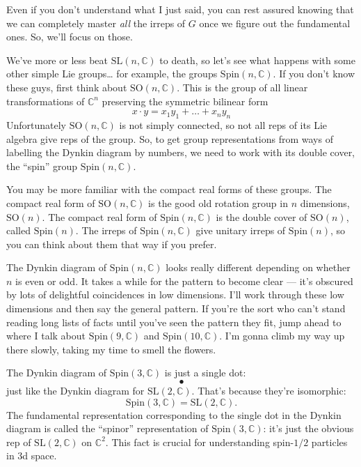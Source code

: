 \documentclass{article}
\begin{document}
Even if you don't understand what I just said, you can rest assured
knowing that we can completely master \emph{all} the irreps of \(G\)
once we figure out the fundamental ones. So, we'll focus on those.

We've more or less beat \(\mathrm{SL}(n,\mathbb{C})\) to death, so let's
see what happens with some other simple Lie groups\ldots{} for example,
the groups \(\mathrm{Spin}(n,\mathbb{C})\). If you don't know these
guys, first think about \(\mathrm{SO}(n,\mathbb{C})\). This is the group
of all linear transformations of \(\mathbb{C}^n\) preserving the
symmetric bilinear form \[x\cdot y = x_1 y_1 + \ldots + x_n y_n\]
Unfortunately \(\mathrm{SO}(n,\mathbb{C})\) is not simply connected, so
not all reps of its Lie algebra give reps of the group. So, to get group
representations from ways of labelling the Dynkin diagram by numbers, we
need to work with its double cover, the ``spin'' group
\(\mathrm{Spin}(n,\mathbb{C})\).

You may be more familiar with the compact real forms of these groups.
The compact real form of \(\mathrm{SO}(n,\mathbb{C})\) is the good old
rotation group in \(n\) dimensions, \(\mathrm{SO}(n)\). The compact real
form of \(\mathrm{Spin}(n,\mathbb{C})\) is the double cover of
\(\mathrm{SO}(n)\), called \(\mathrm{Spin}(n)\). The irreps of
\(\mathrm{Spin}(n,\mathbb{C})\) give unitary irreps of
\(\mathrm{Spin}(n)\), so you can think about them that way if you
prefer.

The Dynkin diagram of \(\mathrm{Spin}(n,\mathbb{C})\) looks really
different depending on whether \(n\) is even or odd. It takes a while
for the pattern to become clear --- it's obscured by lots of delightful
coincidences in low dimensions. I'll work through these low dimensions
and then say the general pattern. If you're the sort who can't stand
reading long lists of facts until you've seen the pattern they fit, jump
ahead to where I talk about \(\mathrm{Spin}(9,\mathbb{C})\) and
\(\mathrm{Spin}(10,\mathbb{C})\). I'm gonna climb my way up there
slowly, taking my time to smell the flowers.

The Dynkin diagram of \(\mathrm{Spin}(3,\mathbb{C})\) is just a single
dot: \[
  \bullet
\] just like the Dynkin diagram for \(\mathrm{SL}(2,\mathbb{C})\).
That's because they're isomorphic:
\[\mathrm{Spin}(3,\mathbb{C}) = \mathrm{SL}(2,\mathbb{C}).\] The
fundamental representation corresponding to the single dot in the Dynkin
diagram is called the ``spinor'' representation of
\(\mathrm{Spin}(3,\mathbb{C})\): it's just the obvious rep of
\(\mathrm{SL}(2,\mathbb{C})\) on \(\mathbb{C}^2\). This fact is crucial
for understanding spin-\(1/2\) particles in 3d space.
\end{document}
